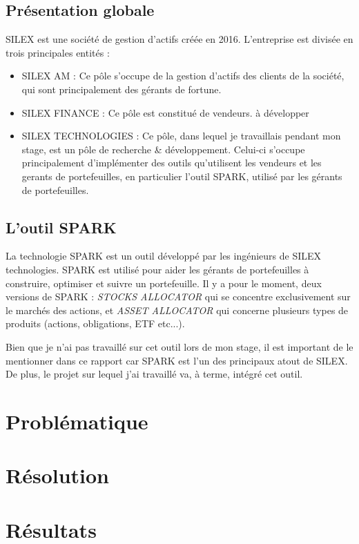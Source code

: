 \documentclass[10pt,a4paper]{article}
\begin{document}
\subsection{Présentation globale}
SILEX est une société de gestion d'actifs créée en 2016. L'entreprise est divisée en trois principales entités : 
\begin{itemize}
    \item SILEX AM : Ce pôle s'occupe de la gestion d'actifs des clients de la société, qui sont principalement des gérants de fortune.
    \item SILEX FINANCE : Ce pôle est constitué de vendeurs. à développer%
    \item SILEX TECHNOLOGIES : Ce pôle, dans lequel je travaillais pendant mon stage, est un pôle de recherche \& développement. Celui-ci s'occupe principalement d'implémenter des outils qu'utilisent les vendeurs et les gerants de portefeuilles, en particulier l'outil SPARK, utilisé par les gérants de portefeuilles.
\end{itemize}
 \subsection{L'outil SPARK}
 La technologie SPARK est un outil développé par les ingénieurs de SILEX technologies. SPARK est utilisé pour aider les gérants de portefeuilles à construire, optimiser et suivre un portefeuille. Il y a pour le moment, deux versions de SPARK : \textit{STOCKS ALLOCATOR} qui se concentre exclusivement sur le marchés des actions, et \textit{ASSET ALLOCATOR} qui concerne plusieurs types de produits (actions, obligations, ETF etc...).  \vspace{0.5em}
 
 Bien que je n'ai pas travaillé sur cet outil lors de mon stage, il est important de le mentionner dans ce rapport car SPARK est l'un des principaux atout de SILEX. De plus, le projet sur lequel j'ai travaillé va, à terme, intégré cet outil.

\newpage
\section{Problématique}
\newpage
\section{Résolution}
\newpage
\section{Résultats}
\newpage
\end{document}
